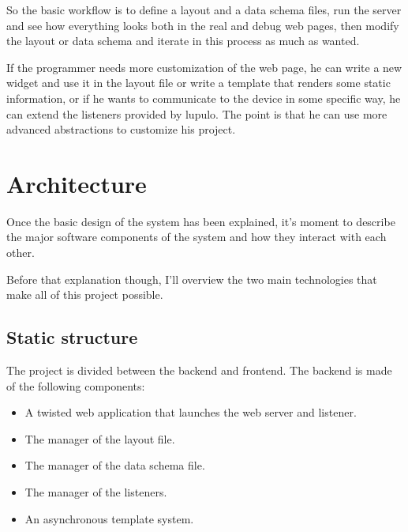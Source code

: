 \documentclass[12pt]{article}
\begin{document}
            So the basic workflow is to define a layout and a data schema files,
            run the server and see how everything looks both in the real and
            debug web pages, then modify the layout or data schema and iterate
            in this process as much as wanted.

            If the programmer needs more customization of the web page, he
            can write a new widget and use it in the layout file or write
            a template that renders some static information, or if he wants to
            communicate to the device in some specific way, he can extend the
            listeners provided by lupulo. The point is that he can use more
            advanced abstractions to customize his project.

    \section{Architecture}

        Once the basic design of the system has been explained, it's moment to
        describe the major software components of the system and how they
        interact with each other.

        Before that explanation though, I'll overview the two main technologies
        that make all of this project possible.

        \subsection{Static structure}
            The project is divided between the backend and frontend. The
            backend is made of the following components:

            \begin{itemize}
                \item A twisted web application that launches the web
                      server and listener.
                \item The manager of the layout file.
                \item The manager of the data schema file.
                \item The manager of the listeners.
                \item An asynchronous template system.
            \end{itemize}
\end{document}

